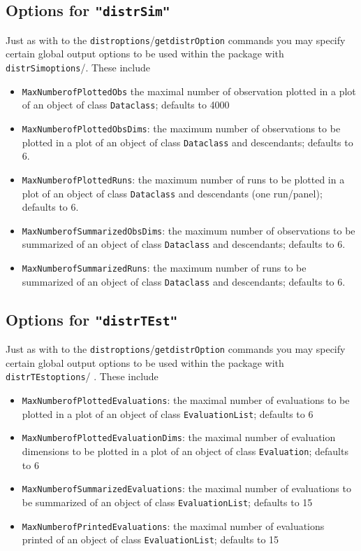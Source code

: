 \documentclass[11pt]{article}
\newcommand{\code}[1]{{\tt #1}}
\newcommand{\pkg}[1]{{\tt "#1"}}
\begin{document}
%
\subsection[Options for distrSim]{Options for \pkg{distrSim}}
Just as with to the \code{distroptions}/\code{getdistrOption} commands you
may specify certain global output options to be used within the package with
\code{distrSimoptions}/\linebreak[4] \code{getdistrSimOption}. These include
\begin{itemize}
  \item \code{MaxNumberofPlottedObs} the maximal number of observation plotted
  in a plot of an object of class \code{Dataclass}; defaults to 4000

  \item \code{MaxNumberofPlottedObsDims}: the maximum number of observations to
  be plotted in a plot of an object of class \code{Dataclass}
  and descendants; defaults to 6.
  \item \code{MaxNumberofPlottedRuns}: the maximum number of runs to be plotted
  in a plot of an object of class \code{Dataclass}
  and descendants (one run/panel); defaults to 6.
  \item \code{MaxNumberofSummarizedObsDims}: the maximum number of observations
  to be summarized of an object of class \code{Dataclass}
  and descendants; defaults to 6.
  \item \code{MaxNumberofSummarizedRuns}: the maximum number of runs to be
   summarized of an object of class \code{Dataclass}
  and descendants; defaults to 6.
\end{itemize}
%
\subsection[Options for distrTEst]{Options for \pkg{distrTEst}}
Just as with to the \code{distroptions}/\code{getdistrOption} commands you may
specify certain
global output options to be used within the package with
\code{distrTEstoptions}/ \linebreak[4]\code{getdistrTEstOption}. These include
\begin{itemize}
  \item \code{MaxNumberofPlottedEvaluations}:  the maximal number of evaluations
  to be plotted
  in a plot of an object of class \code{EvaluationList}; defaults to 6
  \item \code{MaxNumberofPlottedEvaluationDims}: the maximal number of
   evaluation dimensions to be plotted in a plot of an
         object of class \code{Evaluation}; defaults to 6
  \item \code{MaxNumberofSummarizedEvaluations}: the  maximal number of
  evaluations to be summarized of an object of class
  \code{EvaluationList}; defaults to 15
  \item \code{MaxNumberofPrintedEvaluations}: the maximal number of evaluations
   printed of an object of class
  \code{EvaluationList}; defaults to 15
\end{itemize}
\end{document}
